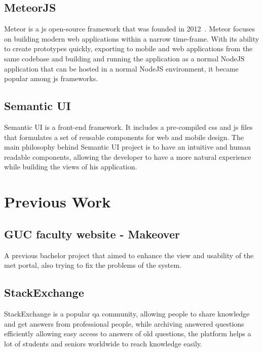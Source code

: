 \subsection{MeteorJS}
\label{sub:meteor}
Meteor is a \ac{js} open-source framework that was founded in 2012~\cite{meteor_launch}.
Meteor focuses on building modern web applications within a narrow time-frame. With its ability to create prototypes quickly, exporting to mobile
and web applications from the same codebase and building and running the application as a normal NodeJS application that can be hosted in a normal
NodeJS environment, it became popular among \ac{js} frameworks.

\subsection{Semantic UI}
\label{sub:semantic_ui}
Semantic UI is a front-end framework. It includes a pre-compiled \ac{css} and \ac{js} files that formulates a set of reusable components
for web and mobile design. The main philosophy behind Semantic UI project is to have an intuitive and human readable components, allowing
the developer to have a more natural experience while building the views of his application.~\cite{semantic_ui}

\section{Previous Work}
\label{sec:previous-work}

\subsection{GUC faculty website - Makeover}
\label{sub:met-makeover-project}
A previous bachelor project that aimed to enhance the view and usability of the \ac{met} portal, also trying to fix the
problems of the system.~\cite{met-makeover}

\subsection{StackExchange}
\label{sub:stackexchange}
StackExchange is a popular \ac{qa} community, allowing people to share knowledge and get answers from professional
people, while archiving answered questions efficiently allowing easy access to answers of old questions, the
platform helps a lot of students and seniors worldwide to reach knowledge easily.
